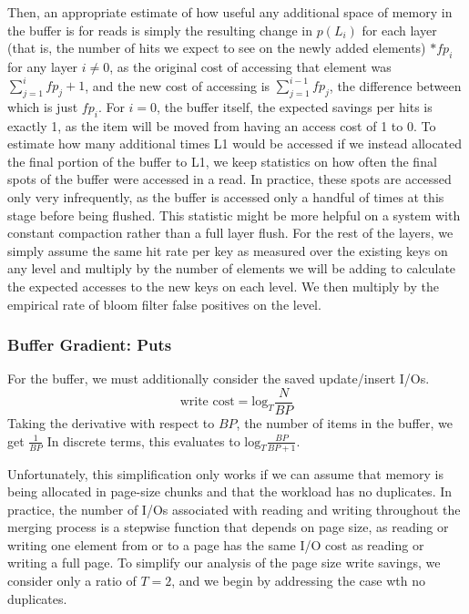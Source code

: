 \documentclass{cidr-2019}
\begin{document}
Then, an appropriate estimate of how useful any additional space of memory in
the buffer is for reads is simply the resulting change in $p(L_i)$ for each layer (that is, the number of hits
we expect to see on the newly added elements) $* fp_{i}$ for any layer $i\neq0$, as the original cost of accessing that element was $\sum_{j=1}^i fp_{j} + 1$, and the new cost of accessing is $\sum_{j=1}^{i-1} fp_{j} $, the difference between which is just $fp_{i}$. For $i=0$, the buffer itself, the expected savings per hits is exactly 1, as the item will be moved from having an access cost of 1 to 0. To estimate how many additional times L1 would be accessed if
we instead allocated the final portion of the buffer to L1, we keep
statistics on how often the final spots of the buffer were accessed in a
read. In practice, these spots are accessed only very infrequently, as the
buffer is accessed only a handful of times at this stage before being flushed.
This statistic might be more helpful on a system with constant compaction
rather than a full layer flush. For the rest of the layers, we simply assume the same hit rate per key
as measured over the existing keys on any level and multiply by the number of elements we will be adding to calculate
the expected accesses to the new keys on each level. We then multiply by the empirical rate of bloom filter false positives on the level.

\subsubsection{Buffer Gradient: Puts}

For the buffer, we must additionally consider the saved update/insert I/Os.  $$
\text{write cost} = \textrm{log}_{T} \frac{N}{BP} $$ Taking the derivative with
respect to $BP$, the number of items in the buffer, we get $\frac{1}{BP}$ In
discrete terms, this evaluates to $\textrm{log}_{T} \frac{BP}{BP+1}$. 

Unfortunately, this simplification only works if we can assume that memory is being allocated in 
page-size chunks and that the workload has no duplicates. In practice, the number of I/Os associated
with reading and writing throughout the merging process is a stepwise function that depends on page size, as reading or
writing one element from or to a page has the same I/O cost as reading or writing a full page. To simplify our analysis
of the page size write savings, we consider only a ratio of $T=2$, and we begin by addressing the case wth no 
duplicates. 
\end{document}
